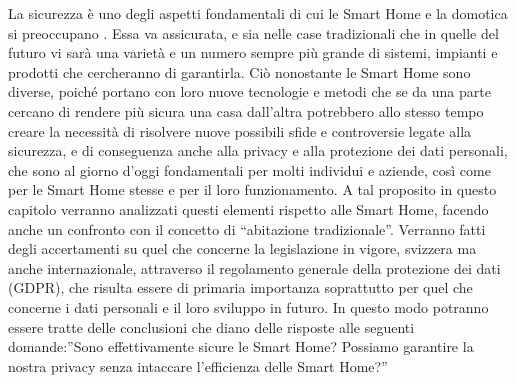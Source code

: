 La sicurezza è uno degli aspetti fondamentali di cui le Smart Home e la domotica si preoccupano . Essa va assicurata, e sia nelle case tradizionali che in quelle del futuro vi sarà una varietà e un numero sempre più grande di sistemi, impianti e prodotti che cercheranno di garantirla. Ciò nonostante le Smart Home sono diverse, poiché portano con loro nuove tecnologie e metodi che se da una parte cercano di rendere più sicura una casa dall’altra potrebbero allo stesso tempo creare la necessità di risolvere nuove possibili sfide e controversie legate alla sicurezza, e di conseguenza anche alla privacy e alla protezione dei dati personali, che sono al giorno d’oggi fondamentali per molti individui e aziende, così come per le Smart Home stesse e per il loro funzionamento.
A tal proposito in questo capitolo verranno analizzati questi elementi rispetto alle Smart Home, facendo anche un confronto con il concetto di “abitazione tradizionale”. Verranno fatti degli accertamenti su quel che concerne la legislazione in vigore, svizzera ma anche internazionale, attraverso il regolamento generale della protezione dei dati (GDPR), che risulta essere di primaria importanza soprattutto per quel che concerne i dati personali e il loro sviluppo in futuro. In questo modo potranno essere tratte delle conclusioni che diano delle risposte alle seguenti domande:”Sono effettivamente sicure le Smart Home? Possiamo garantire la nostra privacy senza intaccare l’efficienza delle Smart Home?”
